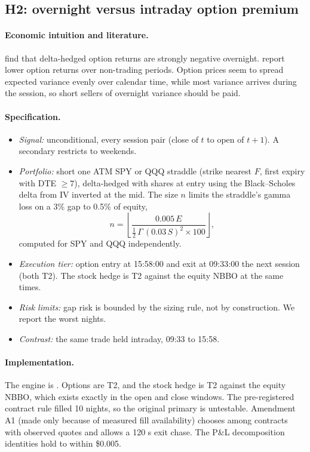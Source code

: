 \documentclass[../main.tex]{subfiles}
\begin{document}
\subsection{H2: overnight versus intraday option premium}\label{sec:h2}

\paragraph{Economic intuition and literature.}
\citet{muravyevni2020} find that delta-hedged option returns are strongly negative overnight. \citet{jones2018} report lower option returns over non-trading periods. Option prices seem to spread expected variance evenly over calendar time, while most variance arrives during the session, so short sellers of overnight variance should be paid.

\paragraph{Specification.}
\begin{itemize}
\item \emph{Signal:} unconditional, every session pair (close of $t$ to open of $t+1$). A secondary restricts to weekends.
\item \emph{Portfolio:} short one ATM SPY or QQQ straddle (strike nearest $F$, first expiry with DTE $\ge 7$), delta-hedged with shares at entry using the Black--Scholes delta from IV inverted at the mid. The size $n$ limits the straddle's gamma loss on a 3\% gap to 0.5\% of equity,
\begin{equation}
n = \left\lfloor \frac{0.005\,E}{\tfrac{1}{2}\,\Gamma\,(0.03\,S)^{2} \times 100} \right\rfloor ,
\end{equation}
computed for SPY and QQQ independently.
\item \emph{Execution tier:} option entry at 15:58:00 and exit at 09:33:00 the next session (both T2). The stock hedge is T2 against the equity NBBO at the same times.
\item \emph{Risk limits:} gap risk is bounded by the sizing rule, not by construction. We report the worst nights.
\item \emph{Contrast:} the same trade held intraday, 09:33 to 15:58.
\end{itemize}

\paragraph{Implementation.}
The engine is . Options are T2, and the stock hedge is T2 against the equity NBBO, which exists exactly in the open and close windows. The pre-registered contract rule filled 10 nights, so the original primary is untestable. Amendment A1 (made only because of measured fill availability) chooses among contracts with observed quotes and allows a 120 s exit chase. The P\&L decomposition identities hold to within \$0.005.
\end{document}
